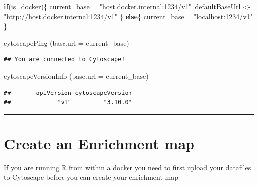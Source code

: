 \documentclass[
]{book}
\newenvironment{Shaded}{\begin{snugshade}}{\end{snugshade}}
\newcommand{\AttributeTok}[1]{\textcolor[rgb]{0.77,0.63,0.00}{#1}}
\newcommand{\ControlFlowTok}[1]{\textcolor[rgb]{0.13,0.29,0.53}{\textbf{#1}}}
\newcommand{\FunctionTok}[1]{\textcolor[rgb]{0.00,0.00,0.00}{#1}}
\newcommand{\NormalTok}[1]{#1}
\newcommand{\OtherTok}[1]{\textcolor[rgb]{0.56,0.35,0.01}{#1}}
\newcommand{\StringTok}[1]{\textcolor[rgb]{0.31,0.60,0.02}{#1}}
\begin{document}
\begin{Shaded}
\begin{Highlighting}[]
\ControlFlowTok{if}\NormalTok{(is\_docker)\{}
\NormalTok{  current\_base }\OtherTok{=} \StringTok{"host.docker.internal:1234/v1"}
\NormalTok{  .defaultBaseUrl }\OtherTok{\textless{}{-}} \StringTok{"http://host.docker.internal:1234/v1"}
\NormalTok{\} }\ControlFlowTok{else}\NormalTok{\{}
\NormalTok{  current\_base }\OtherTok{=} \StringTok{"localhost:1234/v1"}
\NormalTok{\}}

\FunctionTok{cytoscapePing}\NormalTok{ (}\AttributeTok{base.url =}\NormalTok{ current\_base)}
\end{Highlighting}
\end{Shaded}

\begin{verbatim}
## You are connected to Cytoscape!
\end{verbatim}

\begin{Shaded}
\begin{Highlighting}[]
\FunctionTok{cytoscapeVersionInfo}\NormalTok{ (}\AttributeTok{base.url =}\NormalTok{ current\_base)}
\end{Highlighting}
\end{Shaded}

\begin{verbatim}
##       apiVersion cytoscapeVersion 
##             "v1"         "3.10.0"
\end{verbatim}

\begin{center}\rule{0.5\linewidth}{0.5pt}\end{center}

\hypertarget{create-an-enrichment-map}{%
\section{Create an Enrichment map}\label{create-an-enrichment-map}}

If you are running R from within a docker you need to first upload your datafiles to Cytoscape before you can create your enrichment map
\end{document}
